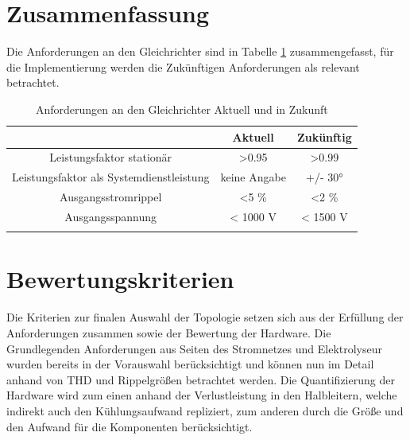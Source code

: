 \section{Zusammenfassung}
Die Anforderungen an den Gleichrichter sind in Tabelle \ref{tab:AnfZsm} zusammengefasst, für die Implementierung werden die Zukünftigen Anforderungen als relevant betrachtet.\\
\begin{table}
\caption{Anforderungen an den Gleichrichter Aktuell und in Zukunft}

\begin{tabular}{c|c|c}
	
	& Aktuell & Zukünftig \\
	\hline
	Leistungsfaktor stationär & >0.95 & >0.99 \\
	\hline
	Leistungsfaktor als Systemdienstleistung & keine Angabe & +/- 30° \\
	\hline
	Ausgangsstromrippel & <5 \% & <2 \% \\
	\hline
	Ausgangsspannung & < 1000 V & < 1500 V \\
	
	
	\label{tab:AnfZsm}
\end{tabular}
\end{table}
\section{Bewertungskriterien}
Die Kriterien zur finalen Auswahl der Topologie setzen sich aus der Erfüllung der Anforderungen zusammen sowie der Bewertung der Hardware. Die Grundlegenden Anforderungen aus Seiten des Stromnetzes und Elektrolyseur wurden bereits in der Vorauswahl berücksichtigt und können nun im Detail anhand von \gls{THD} und Rippelgrößen betrachtet werden. Die Quantifizierung der Hardware wird zum einen anhand der Verlustleistung in den Halbleitern, welche indirekt auch den Kühlungsaufwand repliziert, zum anderen durch die Größe und den Aufwand für die Komponenten berücksichtigt.  